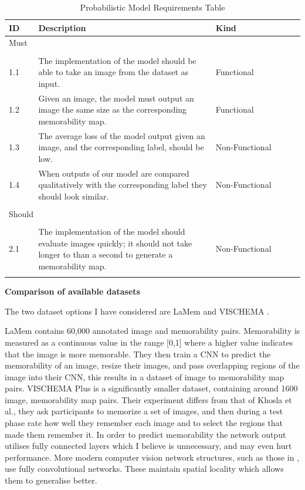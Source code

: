 \documentclass{UoYCSproject}
\begin{document}
\begin{table}[ht]
    \begin{tabular}{p{0.1\linewidth} p{0.6\linewidth} p{0.3\linewidth}}
    \toprule
    ID  & Description & Kind \\ \midrule
    \multicolumn{3}{l}{{Must}} \\
    \hline \\
    1.1 & The implementation of the model should be able to take an image from the dataset as input. & Functional \\
    1.2 & Given an image, the model must output an image the same size as the corresponding memorability map. & Functional \\
    1.3 & The average loss of the model output given an image, and the corresponding label, should be low. & Non-Functional \\
    1.4 & When outputs of our model are compared qualitatively with the corresponding label they should look similar. & Non-Functional \\
    \hline \\
    \multicolumn{3}{l}{{Should}} \\
    \hline \\
    2.1 & The implementation of the model should evaluate images quickly; it should not take longer to than a second to generate a memorability map. & Non-Functional \\
     &  &  \\ \bottomrule
    \end{tabular}
    \caption{Probabilistic Model Requirements Table}
    \label{tab:RequirementCaptureTable}
\end{table}

\textbf{Comparison of available datasets}

The two dataset options I have considered are LaMem \cite{ICCV15_Khosla} and VISCHEMA \cite{VischemaPaper}.

LaMem contains 60,000 annotated image and memorability pairs. Memorability is measured as a continuous value in the range [0,1] where a higher value indicates that the image is more memorable. They then train a CNN to predict the memorability of an image, resize their images, and pass overlapping regions of the image into their CNN, this results in a dataset of image to memorability map pairs.
VISCHEMA Plus is a significantly smaller dataset, containing around 1600 image, memorability map pairs. Their experiment differs from that of Khosla et al., they ask participants to memorize a set of images, and then during a test phase rate how well they remember each image and to select the regions that made them remember it. In order to predict memorability the network output utilises fully connected layers which I believe is unnecessary, and may even hurt performance. More modern computer vision network structures, such as those in \cite{ronneberger2015unet, goodfellow2014generative, ho2020denoising, isola2018imagetoimage, saharia2022palette}, use fully convolutional networks. These maintain spatial locality which allows them to generalise better.
\end{document}

